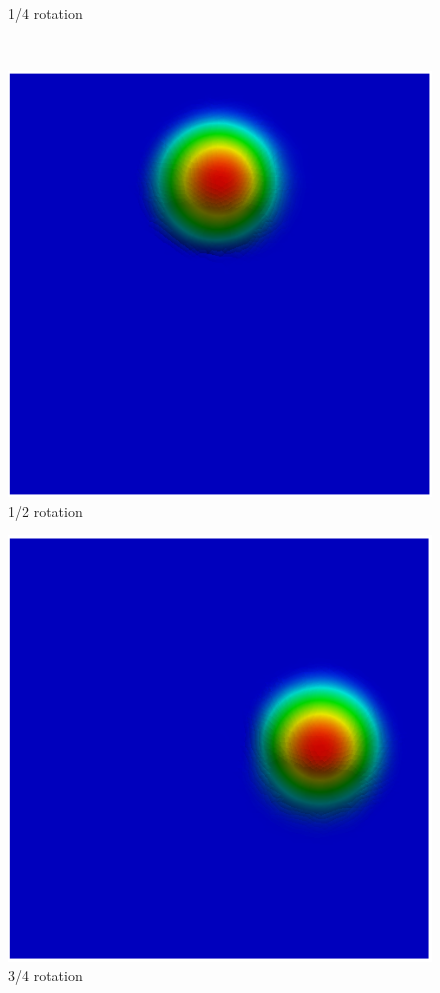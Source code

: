 \begin{frame}
\begin{center}
\begin{figure}[H]
\begin{minipage}{.5\linewidth}
      \tiny 1/4 rotation
     \end{minipage}\\[0.3cm]
     \begin{minipage}{.5\linewidth}
      \centering
      \includegraphics[scale=0.22]{./images/figSLquad2.png}\\
      \tiny 1/2 rotation
     \end{minipage}%
     \begin{minipage}{.5\linewidth}
      \centering
      \includegraphics[scale=0.22]{./images/figSLquad3.png}\\
      \tiny 3/4 rotation
     \end{minipage}
\end{figure}
\end{center}
\end{frame} 

